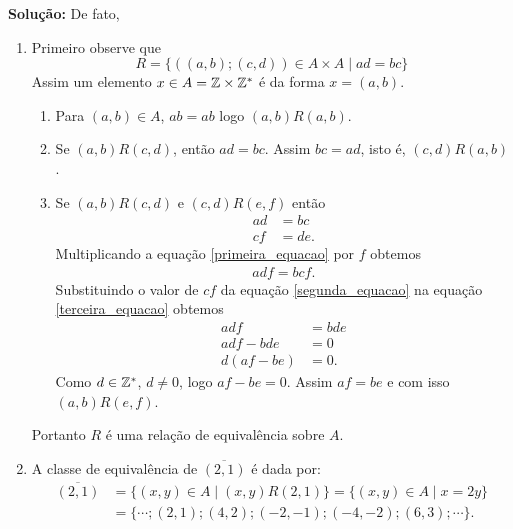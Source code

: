 \documentclass[12pt]{article}
\begin{document}
\noindent\textbf{Solu\c{c}\~ao:} De fato,
	\begin{enumerate}[label={\alph*})]
		\item Primeiro observe que
		\[
			R = \{((a,b);(c,d)) \in A \times A \mid ad = bc\}
		\]
		Assim um elemento $x \in A = \mathbb{Z}\times\mathbb{Z}^*$ é da forma $x = (a,b)$.
		\begin{enumerate}[label={\roman*})]
			\item Para $(a,b) \in A$, $ab = ab$ logo $(a,b)R(a,b)$.
			\item Se $(a,b)R(c,d)$, então $ad = bc$. Assim $bc = ad$, isto é, $(c,d)R(a,b)$.
			\item Se $(a,b)R(c,d)$ e $(c,d)R(e,f)$ então
			\begin{align}
				ad &= bc\label{primeira_equacao}\\
				cf &= de.\label{segunda_equacao}
			\end{align}
			Multiplicando a equação \eqref{primeira_equacao} por $f$ obtemos
			\begin{align}\label{terceira_equacao}
				adf = bcf.
			\end{align}
			Substituindo o valor de $cf$ da equação \eqref{segunda_equacao} na equação \eqref{terceira_equacao} obtemos
			\begin{align*}
				adf &= bde\\
				adf - bde &= 0\\
				d(af - be) &= 0.
			\end{align*}
			Como $d \in \mathbb{Z}^*$, $d \ne 0$, logo $af - be = 0$. Assim $af = be$ e com isso $(a,b)R(e,f)$.
		\end{enumerate}

		Portanto $R$ é uma relação de equivalência sobre $A$.

		\item A classe de equivalência de $\overline{(2,1)}$ é dada por:
		\begin{align*}
			\overline{(2,1)} &= \{(x,y) \in A \mid (x,y)R(2,1)\} = \{(x,y) \in A \mid x = 2y\} \\
			&= \{\cdots; (2,1); (4,2); (-2,-1);(-4,-2);(6,3);\cdots\}.
		\end{align*}
	\end{enumerate}
\end{document}
